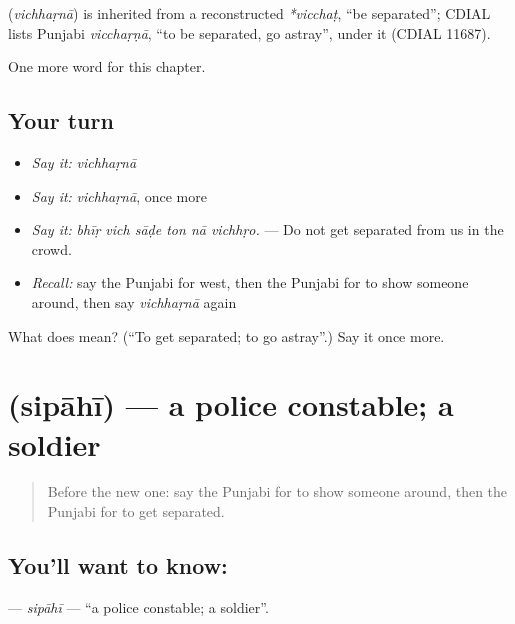 \begin{cousinweb}
\textbf{} (\emph{vichhaṛnā}) is inherited from a reconstructed \emph{*vicchaṭ}, \textquotedblleft{}be separated\textquotedblright{}; CDIAL lists Punjabi \emph{vicchaṛṇā}, \textquotedblleft{}to be separated, go astray\textquotedblright{}, under it (CDIAL 11687).
\end{cousinweb}

\begin{grammarlens}[title={What you've built}]
One more word for this chapter.
\end{grammarlens}

\subsection*{Your turn}
\begin{itemize}
\raggedright
  \item \emph{Say it:} \emph{vichhaṛnā}
  \item \emph{Say it:} \emph{vichhaṛnā}, once more
  \item \emph{Say it:} \emph{bhīṛ vich sāḍe ton nā vichhṛo.} — Do not get separated from us in the crowd.
  \item \emph{Recall:} say the Punjabi for west, then the Punjabi for to show someone around, then say \emph{vichhaṛnā} again
\end{itemize}

\begin{tcolorbox}[breakable,colback=teal!4,colframe=teal!35!black,title={Before you move on}]
What does  mean? (\textquotedblleft{}To get separated; to go astray\textquotedblright{}.) Say it once more.
\end{tcolorbox}
\section[\texorpdfstring{\pa{ਸਿਪਾਹੀ} (sipāhī)}{ਸਿਪਾਹੀ (sipāhī)}]{ (sipāhī) — a police constable; a soldier}

\label{lesson:PA-C272-sipahi}



\begin{quote}
Before the new one: say the Punjabi for to show someone around, then the Punjabi for to get separated.
\end{quote}

\subsection*{You'll want to know: }
\textbf{} — \emph{sipāhī} — \textquotedblleft{}a police constable; a soldier\textquotedblright{}.

